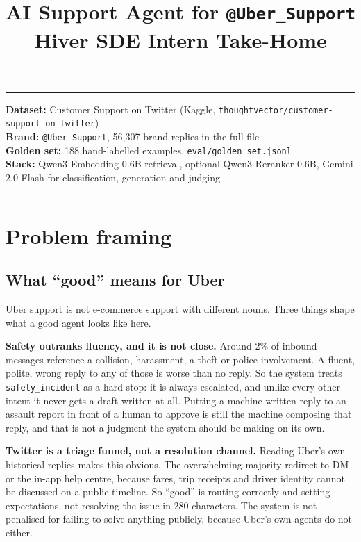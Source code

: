 \documentclass[11pt,a4paper]{article}
\title{\vspace{-2em}AI Support Agent for \texttt{@Uber\_Support}\\
\large Hiver SDE Intern Take-Home}
\author{}
\date{}
\begin{document}
\maketitle
\vspace{-3em}

\noindent\rule{\textwidth}{0.4pt}
\smallskip

\noindent\textbf{Dataset:} Customer Support on Twitter (Kaggle, \texttt{thoughtvector/customer-support-on-twitter})\\
\textbf{Brand:} \texttt{@Uber\_Support}, 56{,}307 brand replies in the full file\\
\textbf{Golden set:} 188 hand-labelled examples, \texttt{eval/golden\_set.jsonl}\\
\textbf{Stack:} Qwen3-Embedding-0.6B retrieval, optional Qwen3-Reranker-0.6B, Gemini 2.0 Flash for classification, generation and judging

\noindent\rule{\textwidth}{0.4pt}

\section{Problem framing}

\subsection{What ``good'' means for Uber}

Uber support is not e-commerce support with different nouns. Three things shape what a
good agent looks like here.

\textbf{Safety outranks fluency, and it is not close.} Around 2\% of inbound messages
reference a collision, harassment, a theft or police involvement. A fluent, polite,
wrong reply to any of those is worse than no reply. So the system treats
\texttt{safety\_incident} as a hard stop: it is always escalated, and unlike every other
intent it never gets a draft written at all. Putting a machine-written reply to an
assault report in front of a human to approve is still the machine composing that reply,
and that is not a judgment the system should be making on its own.

\textbf{Twitter is a triage funnel, not a resolution channel.} Reading Uber's own
historical replies makes this obvious. The overwhelming majority redirect to DM or the
in-app help centre, because fares, trip receipts and driver identity cannot be discussed
on a public timeline. So ``good'' is routing correctly and setting expectations, not
resolving the issue in 280 characters. The system is not penalised for failing to solve
anything publicly, because Uber's own agents do not either.
\end{document}
